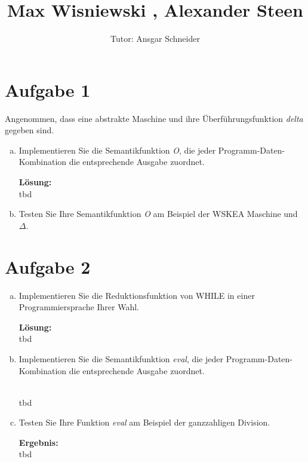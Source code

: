 \documentclass[11pt,a4paper,ngerman]{article}
\author{Tutor: Ansgar Schneider}
\date{}
\title{Max Wisniewski , Alexander Steen}
\begin{document}

\maketitle
\thispagestyle{fancy}



\section*{Aufgabe 1}

Angenommen, dass eine abstrakte Maschine und ihre Überführungsfunktion \emph{delta} gegeben sind.

\begin{enumerate}[a)]
    \item   Implementieren Sie die Semantikfunktion \emph{O}, die jeder Programm-Daten-Kombination
            die entsprechende Ausgabe zuordnet.

            \textbf{Lösung:}\\
            tbd

    \item   Testen Sie Ihre Semantikfunktion \emph{O} am Beispiel der WSKEA Maschine und $\Delta$.

\end{enumerate}

\section*{Aufgabe 2}

\begin{enumerate}[a)]
    \item   Implementieren Sie die Reduktionsfunktion von WHILE in einer Programmiersprache
            Ihrer Wahl.

            \textbf{Lösung:}\\
            tbd

    \item   Implementieren Sie die Semantikfunktion \emph{eval}, die jeder Programm-Daten-Kombination
            die entsprechende Ausgabe zuordnet.

            \\
            tbd

    \item   Testen Sie Ihre Funktion \emph{eval} am Beispiel der ganzzahligen Division.

            \textbf{Ergebnis:}\\
            tbd
\end{enumerate}
\end{document}
